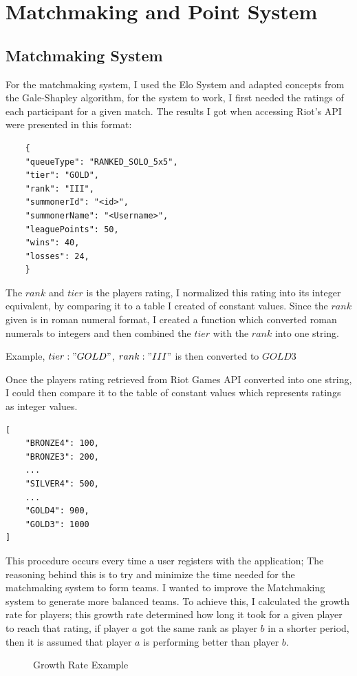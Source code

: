 \section{Matchmaking and Point System}
\subsection{Matchmaking System}
For the matchmaking system, I used the Elo System and adapted concepts from the Gale-Shapley algorithm, for the system to work, I first needed the ratings of each participant for a given match. The results I got when accessing Riot's API were presented in this format:
\begin{verbatim}
	{
	"queueType": "RANKED_SOLO_5x5",
	"tier": "GOLD",
	"rank": "III",
	"summonerId": "<id>",
	"summonerName": "<Username>",
	"leaguePoints": 50,
	"wins": 40,
	"losses": 24,
	}
\end{verbatim}

The $rank$ and $tier$ is the players rating, I normalized this rating into its integer equivalent, by comparing it to a table I created of constant values.
Since the $rank$ given is in roman numeral format, I created a function which converted roman numerals to integers and then combined the $tier$ with the $rank$ into one string.\hfill \break

Example, $tier: "GOLD"$, $ rank: "III"$ is then converted to $GOLD3$

Once the players rating retrieved from Riot Games API converted into one string, I could then compare it to the table of constant values which represents ratings as integer values.

\begin{verbatim}
[
	"BRONZE4": 100,
	"BRONZE3": 200,
	...
	"SILVER4": 500,
	...
	"GOLD4": 900,
	"GOLD3": 1000
]
\end{verbatim}
\hfill \break
This procedure occurs every time a user registers with the application; The reasoning behind this is to try and minimize the time needed for the matchmaking system to form teams.\hfill \break
I wanted to improve the Matchmaking system to generate more balanced teams.
To achieve this, I calculated the growth rate \cite{d2010production} for players; this growth rate determined how long it took for a given player to reach that rating, if player $a$ got the same rank as player $b$ in a shorter period, then it is assumed that player $a$ is performing better than player $b$.

\begin{figure}[H]
	\centering
{}
	\caption{Growth Rate Example}
	\label{tikz:growth}
\end{figure}

